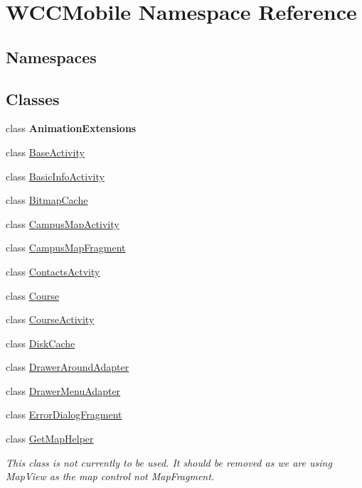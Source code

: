 \hypertarget{namespace_w_c_c_mobile}{}\section{W\+C\+C\+Mobile Namespace Reference}
\label{namespace_w_c_c_mobile}
\subsection*{Namespaces}
\begin{DoxyCompactItemize}
\end{DoxyCompactItemize}
\subsection*{Classes}
\begin{DoxyCompactItemize}
\item 
class {\bfseries Animation\+Extensions}
\item 
class \hyperlink{class_w_c_c_mobile_1_1_base_activity}{Base\+Activity}
\item 
class \hyperlink{class_w_c_c_mobile_1_1_basic_info_activity}{Basic\+Info\+Activity}
\item 
class \hyperlink{class_w_c_c_mobile_1_1_bitmap_cache}{Bitmap\+Cache}
\item 
class \hyperlink{class_w_c_c_mobile_1_1_campus_map_activity}{Campus\+Map\+Activity}
\item 
class \hyperlink{class_w_c_c_mobile_1_1_campus_map_fragment}{Campus\+Map\+Fragment}
\item 
class \hyperlink{class_w_c_c_mobile_1_1_contacts_actvity}{Contacts\+Actvity}
\item 
class \hyperlink{class_w_c_c_mobile_1_1_course}{Course}
\item 
class \hyperlink{class_w_c_c_mobile_1_1_course_activity}{Course\+Activity}
\item 
class \hyperlink{class_w_c_c_mobile_1_1_disk_cache}{Disk\+Cache}
\item 
class \hyperlink{class_w_c_c_mobile_1_1_drawer_around_adapter}{Drawer\+Around\+Adapter}
\item 
class \hyperlink{class_w_c_c_mobile_1_1_drawer_menu_adapter}{Drawer\+Menu\+Adapter}
\item 
class \hyperlink{class_w_c_c_mobile_1_1_error_dialog_fragment}{Error\+Dialog\+Fragment}
\item 
class \hyperlink{class_w_c_c_mobile_1_1_get_map_helper}{Get\+Map\+Helper}
\begin{DoxyCompactList}\small\item\em This class is not currently to be used. It should be removed as we are using Map\+View as the map control not Map\+Fragment. \end{DoxyCompactList}\item 

\end{DoxyCompactItemize}
